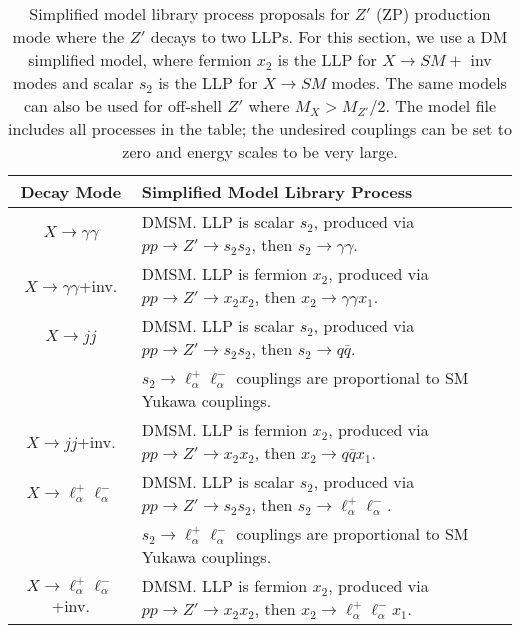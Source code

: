 \begin{table}
\begin{center}
\begin{tabular}{ |c|l|} 
 \hline
Decay Mode & Simplified Model Library Process \\
\hline\hline
$X\rightarrow \gamma\gamma$ & DMSM. LLP is scalar $s_2$, produced via $p p \rightarrow Z' \rightarrow s_2 s_2$, then $s_2 \rightarrow \gamma \gamma$. \\
\hline
$X\rightarrow \gamma\gamma$+inv. &  DMSM. LLP is fermion $x_2$, produced via $p p \rightarrow Z' \rightarrow x_2 x_2$, then $ x_2 \rightarrow \gamma \gamma x_1$.    \\
\hline
$X\rightarrow jj$&  DMSM. LLP is scalar $s_2$, produced via $p p \rightarrow Z' \rightarrow s_2 s_2$, then $ s_2 \rightarrow q \bar q$.\\
& $s_2 \rightarrow \ell_\alpha^+\ell_\alpha^-$ couplings are proportional to SM Yukawa couplings.\\
\hline
$X\rightarrow jj$+inv.& DMSM. LLP is fermion $x_2$, produced via $p p \rightarrow Z' \rightarrow x_2 x_2$, then $ x_2 \rightarrow q \bar q x_1$.\\
\hline
$X\rightarrow \ell_\alpha^+\ell_\alpha^-$ &  DMSM. LLP is scalar $s_2$, produced via $p p \rightarrow Z' \rightarrow s_2 s_2$, then $ s_2 \rightarrow \ell_\alpha^+\ell_\alpha^-$.\\
& $s_2 \rightarrow \ell_\alpha^+\ell_\alpha^-$ couplings are proportional to SM Yukawa couplings.\\
\hline
$X\rightarrow \ell_\alpha^+\ell_\alpha^-$+inv. &   DMSM. LLP is fermion $x_2$, produced via $p p \rightarrow Z' \rightarrow x_2 x_2$, then $x_2 \rightarrow \ell_\alpha^+\ell_\alpha^- x_1$.\\

\hline
\end{tabular}
\end{center}
\caption{Simplified model library process proposals for $Z'$ (ZP) production mode where the $Z'$ decays to two LLPs. For this section, we use a DM simplified model, where fermion $x_2$ is the LLP for $X \rightarrow SM +$ inv modes and scalar $s_2$ is the LLP for $X \rightarrow SM$ modes. The same models can also be used for off-shell $Z'$ where $M_X > M_{Z'}/2$. The model file includes all processes in the table; the undesired couplings can be set to zero and energy scales to be very large. }\label{tab:Zp_neutral_library}
\end{table}
%
